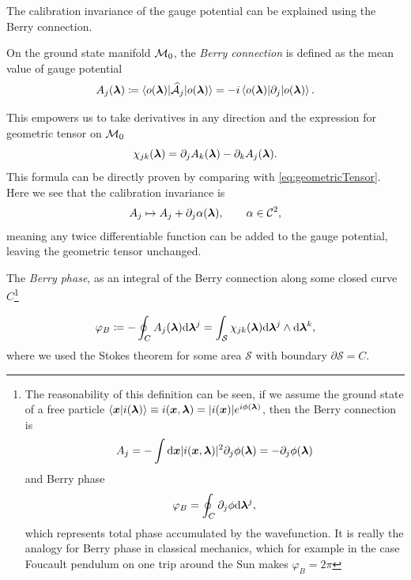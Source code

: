 The calibration invariance of the gauge potential can be explained using the Berry connection.
\begin{definition}    
    On the ground state manifold $\mathcal{M}_0$, the \emph{Berry connection} is defined as the mean value of gauge potential
    \begin{equation}
        A_j({\bm\lambda})\coloneqq \braket{o({\bm\lambda})|\mathcal{\widehat{A}}_j|o({\bm\lambda})}= -i \braket{o({\bm\lambda})|\partial_j|o({\bm\lambda})}.
        \label{eq:berryConnection}
    \end{equation}
\end{definition}
    

This empowers us to take derivatives in any direction and the expression for geometric tensor on $\mathcal{M}_0$
\begin{equation}
    \chi_{jk}({\bm\lambda}) = \partial_j A_k({\bm\lambda})-\partial_k A_j({\bm\lambda})
    \label{eq:geometricTensorRedef}.
\end{equation}
This formula can be directly proven by comparing with \ref{eq:geometricTensor}. Here we see that the calibration invariance is 
\begin{equation}
    A_j \mapsto A_j+\partial_j \alpha({\bm\lambda}),\qquad \alpha\in\mathcal C^2,
\end{equation}
meaning any twice differentiable function can be added to the gauge potential, leaving the geometric tensor unchanged.

\begin{definition}
    
    The \emph{Berry phase}, as an integral of the Berry connection along some closed curve $C$\footnote{
        The reasonability of this definition can be seen, if we assume the ground state of a free particle
        $\braket{\bm{x}|i({\bm\lambda})}\equiv i(\bm{x},{\bm\lambda})= |i(\bm{x})|e^{i\phi({\bm\lambda})}$,
        then the Berry connection is
        \begin{equation}
            A_j=-\int \mathrm{d} \bm{x}|i(\bm{x},{\bm\lambda})|^2\partial_j \phi({\bm\lambda}) = -\partial_j \phi({\bm\lambda})
        \end{equation} 
        and Berry phase
        \begin{equation}
            \varphi_B=\oint_C \partial_j \phi \mathrm{d} {\bm\lambda}^j,
        \end{equation}
        which represents total phase accumulated by the wavefunction. It is really the analogy for Berry phase in classical mechanics, which for example in the case Foucault pendulum on one trip around the Sun makes $\varphi_B=2\pi$
        }

    \begin{equation}
        \varphi_B\coloneqq-\oint_C A_j({\bm\lambda})\mathrm{d} {\bm\lambda}^j=\int_\mathcal{S} \chi_{jk}({\bm\lambda})\mathrm{d} {\bm\lambda}^j \wedge \mathrm{d}{\bm\lambda}^k,
    \end{equation}
    where we used the Stokes theorem for some area $\mathcal{S}$ with boundary $\partial\mathcal{S}=C$.    
    
\end{definition}

